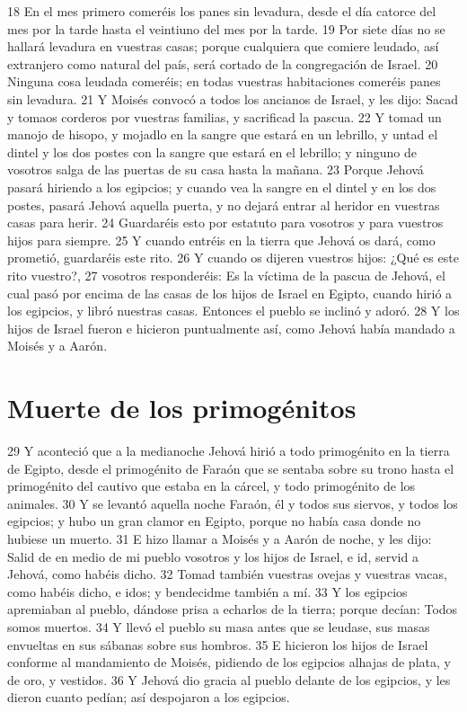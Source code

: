 18 En el mes primero comeréis los panes sin levadura, desde el día catorce del mes por la tarde hasta el veintiuno del mes por la tarde.
19 Por siete días no se hallará levadura en vuestras casas; porque cualquiera que comiere leudado, así extranjero como natural del país, será cortado de la congregación de Israel.
20 Ninguna cosa leudada comeréis; en todas vuestras habitaciones comeréis panes sin levadura.
21 Y Moisés convocó a todos los ancianos de Israel, y les dijo: Sacad y tomaos corderos por vuestras familias, y sacrificad la pascua.
22 Y tomad un manojo de hisopo, y mojadlo en la sangre que estará en un lebrillo, y untad el dintel y los dos postes con la sangre que estará en el lebrillo; y ninguno de vosotros salga de las puertas de su casa hasta la mañana.
23 Porque Jehová pasará hiriendo a los egipcios; y cuando vea la sangre en el dintel y en los dos postes, pasará Jehová aquella puerta, y no dejará entrar al heridor en vuestras casas para herir.
24 Guardaréis esto por estatuto para vosotros y para vuestros hijos para siempre.
25 Y cuando entréis en la tierra que Jehová os dará, como prometió, guardaréis este rito.
26 Y cuando os dijeren vuestros hijos: ¿Qué es este rito vuestro?,
27 vosotros responderéis: Es la víctima de la pascua de Jehová, el cual pasó por encima de las casas de los hijos de Israel en Egipto, cuando hirió a los egipcios, y libró nuestras casas. Entonces el pueblo se inclinó y adoró.
28 Y los hijos de Israel fueron e hicieron puntualmente así, como Jehová había mandado a Moisés y a Aarón.

\section*{Muerte de los primogénitos}
29 Y aconteció que a la medianoche Jehová hirió a todo primogénito en la tierra de Egipto, desde el primogénito de Faraón que se sentaba sobre su trono hasta el primogénito del cautivo que estaba en la cárcel, y todo primogénito de los animales.
30 Y se levantó aquella noche Faraón, él y todos sus siervos, y todos los egipcios; y hubo un gran clamor en Egipto, porque no había casa donde no hubiese un muerto.
31 E hizo llamar a Moisés y a Aarón de noche, y les dijo: Salid de en medio de mi pueblo vosotros y los hijos de Israel, e id, servid a Jehová, como habéis dicho.
32 Tomad también vuestras ovejas y vuestras vacas, como habéis dicho, e idos; y bendecidme también a mí.
33 Y los egipcios apremiaban al pueblo, dándose prisa a echarlos de la tierra; porque decían: Todos somos muertos.
34 Y llevó el pueblo su masa antes que se leudase, sus masas envueltas en sus sábanas sobre sus hombros.
35 E hicieron los hijos de Israel conforme al mandamiento de Moisés, pidiendo de los egipcios alhajas de plata, y de oro, y vestidos.
36 Y Jehová dio gracia al pueblo delante de los egipcios, y les dieron cuanto pedían; así despojaron a los egipcios.

